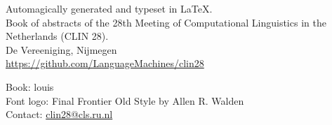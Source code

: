 \hspace{0pt}
\vspace{\fill}

Automagically generated and typeset in \LaTeX. \\[2em]

Book of abstracts of the 28th Meeting of Computational Linguistics in the Netherlands (CLIN 28).\\[1em]

De Vereeniging, Nijmegen \\[2em]

\url{https://github.com/LanguageMachines/clin28}

Book: louis \\
Font logo: Final Frontier Old Style by Allen R. Walden \\
Contact: \url{clin28@cls.ru.nl}
